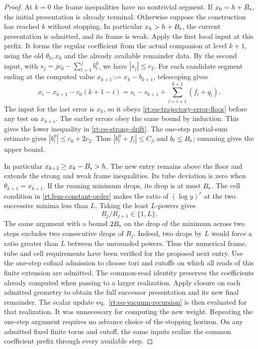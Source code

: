 \documentclass[11pt,letterpaper,reqno]{amsart}
\numberwithin{equation}{section}
\renewcommand{\eqref}[1]{\textup{eq.~\ref{#1}}}
\theoremstyle{definition}
\theoremstyle{remark}
\begin{document}
\begin{proof}
At \(k=0\) the frame inequalities have no nontrivial segment.
If \(x_0=h+B_{\rm s}\), the initial presentation is already
terminal. Otherwise suppose the construction has reached \(k\)
without stopping. In particular \(x_k>h+B_{\rm s}\), the
current presentation is admitted, and its frame is weak.
Apply the first local input at this prefix. It forms the
regular coefficient from the actual companion at level \(k+1\),
using the old \(\theta_k,x_k\) and the already available
remainder data. By the second input, with
\(s_j=jc_0-\sum_{l=1}^j b_l^0\), we have \(|s_j|\le c_2\).
For each candidate segment ending at the computed value
\(x_{k+1}:=x_k-b_{k+1}\), telescoping gives
\begin{equation}\label{rt:eq-block-telescope}
 x_i-x_{k+1}-c_0(k+1-i)
     =s_i-s_{k+1}+\sum_{l=i+1}^{k+1}(f_l+q_l).
\end{equation}
The input for the last error is \(x_k\), so it obeys
\cref{rt:eq-trajectory-error-floor} before any test on
\(x_{k+1}\). The earlier errors obey the same bound by induction.
This gives the lower inequality in \cref{rt:eq-strong-drift}.
The one-step partial-sum estimate gives
\(|b_l^0|\le c_0+2c_2\). Thus
\(|b_l^0+f_l|\le C_\beta\) and \(b_l\le B_{\rm s}\);
summing gives the upper bound.

In particular \(x_{k+1}\ge x_k-B_{\rm s}>h\). The new
entry remains above the floor and extends the strong and weak
frame inequalities. Its tube deviation is zero when
\(\theta_{k+1}=x_{k+1}\). If the running minimum drops, its
drop is at most \(B_{\rm s}\). The cell condition in
\cref{rt:lem-constant-order} makes the ratio of \((\log y)^r\)
at the two successive minima less than \(L\). Taking the least
\(L\)-powers gives
\begin{equation}\label{rt:eq-adjacent-cell}
                  R_j/R_{j+1}\in\{1,L\}.
\end{equation}
The same argument with a bound \(2B_{\rm s}\) on the drop of
the minimum across two steps excludes two consecutive drops
of \(R_j\). Indeed, two drops by \(L\) would force a ratio
greater than \(L\) between the unrounded powers.
Thus the numerical frame, tube and cell requirements have been verified
for the proposed next entry. Use the one-step cofinal admission to
choose tori and cutoffs on which all reads of this finite extension are
admitted. The common-read identity preserves the coefficients already
computed when passing to a larger realization. Apply closure on each
admitted geometry to obtain the full successor presentation and its
new final remainder. The scalar update \eqref{rt:eq-vacuum-recursion}
is then evaluated for that realization. It was unnecessary for
computing the new weight. Repeating the one-step argument requires no
advance choice of the stopping horizon. On any admitted fixed finite
torus and cutoff, the same inputs realize the common coefficient
prefix through every available step.


\end{proof}
\end{document}
